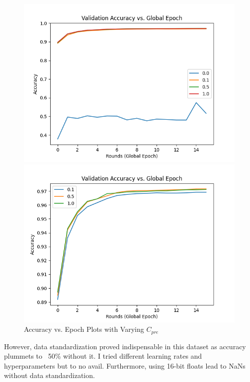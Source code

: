\begin{figure}[h]
    \centering
    \begin{minipage}{.5\textwidth}
        \centering
        \includegraphics[width=\textwidth]{images/cpreall.png}
    \end{minipage}%
    \begin{minipage}{.5\textwidth}
        \centering
        \includegraphics[width=\textwidth]{images/cpretop.png}
    \end{minipage}
    \caption{Accuracy vs. Epoch Plots with Varying $C_{pre}$}
    \label{fig:varycpre}
\end{figure}

However, data standardization proved indispensable in this dataset as accuracy plummets to ~50\% without it.
I tried different learning rates and hyperparameters but to no avail.
Furthermore, using 16-bit floats lead to NaNs without data standardization.


